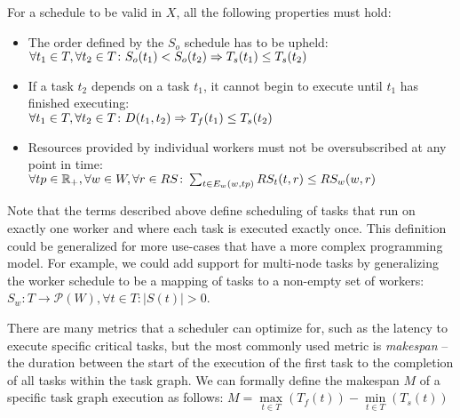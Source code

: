 For a schedule to be valid in $X$, all the following properties must hold:

\begin{itemize}
	\item The order defined by the $S_o$ schedule has to be upheld: \\
	      $\forall t_1\in{}T, \forall t_2\in{}T\colon S_o(t_1) < S_o(t_2) \Rightarrow T_s(t_1) \leq T_s(t_2)$
	\item If a task $t_2$ depends on a task $t_1$, it cannot begin to
	      execute until $t_1$ has finished executing: \\ $\forall t_1\in{}T, \forall t_2\in{}T\colon D(t_1, t_2) \Rightarrow T_f(t_1) \leq T_s(t_2)$
	\item Resources provided by individual workers must not be oversubscribed at any point in time: \\
	      $\forall tp\in\mathbb{R_{+}}, \forall w\in{}W, \forall r\in{}RS\colon
		      \sum_{t\in{}E_w(w, tp)} RS_t(t, r) \leq RS_w(w, r)$
\end{itemize}

Note that the terms described above define scheduling of tasks that run on exactly one worker and
where each task is executed exactly once. This definition could be generalized for more use-cases
that have a more complex programming model. For example, we could add support for multi-node tasks
by generalizing the worker schedule to be a mapping of tasks to a non-empty set of workers:
$S_w\colon T \rightarrow \mathcal{P}(W), \forall t\in{}T\colon |S(t)| > 0$.

There are many metrics that a scheduler can optimize for, such as the latency to execute specific
critical tasks, but the most commonly used metric is \emph{makespan} -- the duration between
the start of the execution of the first task to the completion of all tasks within the task graph.
We can formally define the makespan $M$ of a specific task graph execution as
follows: $M = \max\limits_{t \in T}(T_f(t)) - \min\limits_{t \in T}(T_s(t))$

